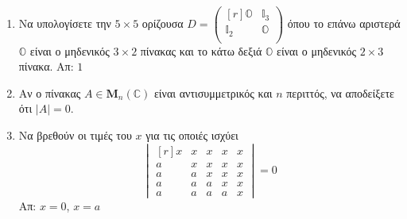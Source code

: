 \documentclass[a4paper,table]{report}
\begin{document}
\begin{enumerate}
  \item Να υπολογίσετε την $ 5\times 5$ ορίζουσα $ D = 
    \begin{pmatrix*}[r]
    \mathbb{O} & \mathbb{I}_{3} \\
  \mathbb{I}_{2} & \mathbb{O} \\
\end{pmatrix*} $ όπου το επάνω αριστερά $ \mathbb{O} $ είναι ο μηδενικός $ 3\times 2 $ 
πίνακας και το κάτω δεξιά $ \mathbb{O} $ είναι ο μηδενικός $ 2\times 3 $ πίνακα.
\hfill Απ: $ 1 $ 

\item Αν ο πίνακας $ A \in \textbf{M}_{n}(\mathbb{C}) $ είναι αντισυμμετρικός 
  και $n$ περιττός, να αποδείξετε ότι $ |A|=0 $.

\item Να βρεθούν οι τιμές του $ x $ για τις οποιές ισχύει
  \[
    \begin{vmatrix*}[r]
      x & x & x & x & x \\
      a & x & x & x & x \\
      a & a & x & x & x \\
      a & a & a & x & x \\
      a & a & a & a & x
    \end{vmatrix*} = 0
   \]
   \hfill Απ: $ x=0 $, $ x=a $  
\end{enumerate}
\end{document}
